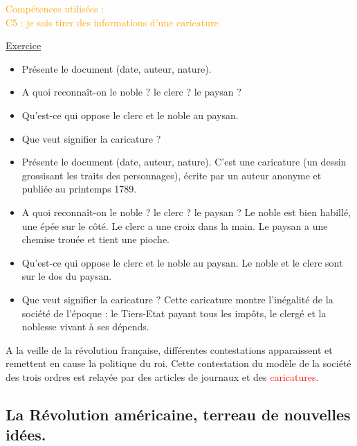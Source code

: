 \documentclass{beamer}
\begin{document}
\begin{frame}
\begin{flushright}
{\tiny \textcolor{orange}{Compétences utilisées : \\
C5 : je sais tirer des informations d'une caricature}}
\end{flushright}
\underline{Exercice}
\begin{itemize}
\item Présente le document (date, auteur, nature).
\item A quoi reconnaît-on le noble ? le clerc ? le paysan ? 
\item Qu'est-ce qui oppose le clerc et le noble au paysan.
\item Que veut signifier la caricature ?
\end{itemize}
\end{frame}

\begin{frame}
\begin{itemize}
\item Présente le document (date, auteur, nature).
\pause\textcolor{black!70!green}{C'est une caricature (un dessin grossisant les traits des personnages), écrite par un auteur anonyme et publiée au printemps 1789.}
\item A quoi reconnaît-on le noble ? le clerc ? le paysan ? 
\pause\textcolor{black!70!green}{Le noble est bien habillé, une épée sur le côté. Le clerc a une croix dans la main. Le paysan a une chemise trouée et tient une pioche.}
\item Qu'est-ce qui oppose le clerc et le noble au paysan.
\pause\textcolor{black!70!green}{Le noble et le clerc sont sur le dos du paysan.}
\item Que veut signifier la caricature ?
\pause\textcolor{black!70!green}{Cette caricature montre l'inégalité de la société de l'époque : le Tiers-Etat payant tous les impôts, le clergé et la noblesse vivant à ses dépends.}
\end{itemize}
\end{frame}

\begin{frame}
\setlength{\parindent}{1cm} A la veille de la révolution française, différentes contestations apparaissent et remettent en cause la politique du roi. Cette contestation du modèle de la société des trois ordres est relayée par des articles de journaux et des \textcolor{red}{caricatures.}
\end{frame}

\subsection{La Révolution américaine, terreau de nouvelles idées. }
\end{document}
